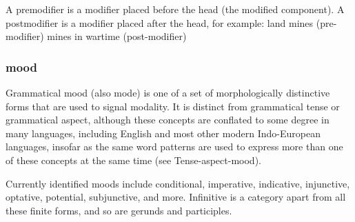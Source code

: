 \begin{small}
A premodifier is a modifier placed before the head (the modified component). A postmodifier is a modifier placed after the head, for example:
land mines (pre-modifier)
mines in wartime (post-modifier)
\subsubsection{mood}
Grammatical mood (also mode) is one of a set of morphologically distinctive forms that are used to signal modality.  It is distinct from grammatical tense or grammatical aspect, although these concepts are conflated to some degree in many languages, including English and most other modern Indo-European languages, insofar as the same word patterns are used to express more than one of these concepts at the same time (see Tense-aspect-mood).

Currently identified moods include conditional, imperative, indicative, injunctive, optative, potential, subjunctive, and more. Infinitive is a category apart from all these finite forms, and so are gerunds and participles.


\end{small}
